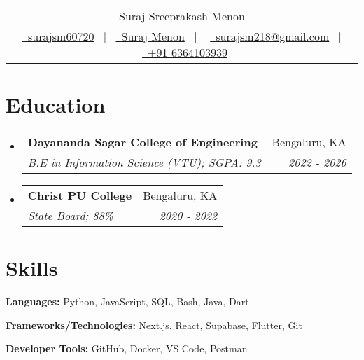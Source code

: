 \documentclass[a4paper,11pt]{article}
\makeatletter
\newcommand{\resumeSubheading}[4]{
  \vspace{1pt}\item
    \begin{tabular*}{0.97\textwidth}{l@{\extracolsep{\fill}}r}
      \textbf{#1} & #2 \\
      \textit{\small#3} & \textit{\small #4} \\
    \end{tabular*}\vspace{-1pt}
}
\newcommand{\resumeSubHeadingListStart}{\begin{itemize}[leftmargin=*, itemsep=3.8pt, parsep=0pt, topsep=4.8pt, partopsep=0pt]}
\newcommand{\resumeSubHeadingListEnd}{\end{itemize}}
\makeatother
\begin{document}
\pagestyle{empty}


\begin{tabularx}{\linewidth}{@{} C @{}}
	\Huge{Suraj Sreeprakash Menon}                                              \\[7pt]
	\href{https://github.com/surajsm60720}{\raisebox{-0.05\height}\faGithub\ surajsm60720} \ $|$ \
	\href{https://www.linkedin.com/in/suraj-menon-a581ab305/}{\raisebox{-0.05\height}\faLinkedin\ Suraj Menon} \ $|$ \
	\href{mailto:surajsm218@gmail.com}{\raisebox{-0.05\height}\faEnvelope \ surajsm218@gmail.com} \ $|$ \
	\href{tel:+916364103939}{\raisebox{-0.05\height}\faMobile \ +91 6364103939} \\
\end{tabularx}



\section{Education}
  \resumeSubHeadingListStart
    \resumeSubheading
      {Dayananda Sagar College of Engineering}{Bengaluru, KA}
      {B.E in Information Science (VTU);  SGPA: 9.3}{2022 - 2026}
    \resumeSubheading
      {Christ PU College}{Bengaluru, KA}
      {State Board;  88\%}{2020 - 2022}
  \resumeSubHeadingListEnd



\section{Skills}

\textbf{Languages:} Python, JavaScript, SQL, Bash, Java, Dart

\textbf{Frameworks/Technologies:} Next.js, React, Supabase, Flutter, Git

\textbf{Developer Tools:} GitHub, Docker, VS Code, Postman
\end{document}
